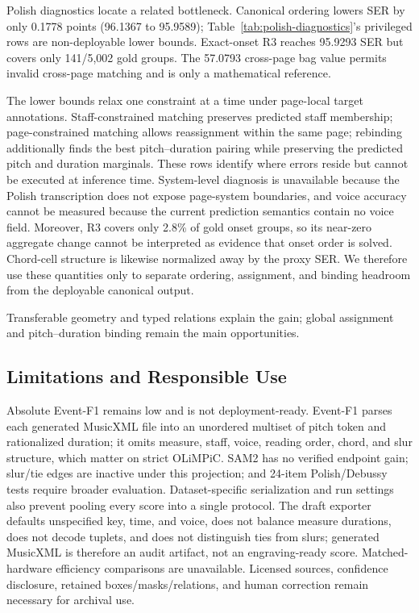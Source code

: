 \FloatBarrier

Polish diagnostics locate a related bottleneck. Canonical ordering lowers SER by only 0.1778 points (96.1367 to 95.9589); Table~\ref{tab:polish-diagnostics}'s privileged rows are non-deployable lower bounds. Exact-onset R3 reaches 95.9293 SER but covers only 141/5,002 gold groups. The 57.0793 cross-page bag value permits invalid cross-page matching and is only a mathematical reference.



The lower bounds relax one constraint at a time under page-local target annotations. Staff-constrained matching preserves predicted staff membership; page-constrained matching allows reassignment within the same page; rebinding additionally finds the best pitch--duration pairing while preserving the predicted pitch and duration marginals. These rows identify where errors reside but cannot be executed at inference time. System-level diagnosis is unavailable because the Polish transcription does not expose page-system boundaries, and voice accuracy cannot be measured because the current prediction semantics contain no voice field. Moreover, R3 covers only 2.8\% of gold onset groups, so its near-zero aggregate change cannot be interpreted as evidence that onset order is solved. Chord-cell structure is likewise normalized away by the proxy SER. We therefore use these quantities only to separate ordering, assignment, and binding headroom from the deployable canonical output.

\newpage
Transferable geometry and typed relations explain the gain; global assignment and pitch--duration binding remain the main opportunities.

\subsection{Limitations and Responsible Use}
Absolute Event-F1 remains low and is not deployment-ready. Event-F1 parses each generated MusicXML file into an unordered multiset of pitch token and rationalized duration; it omits measure, staff, voice, reading order, chord, and slur structure, which matter on strict OLiMPiC. SAM2 has no verified endpoint gain; slur/tie edges are inactive under this projection; and 24-item Polish/Debussy tests require broader evaluation. Dataset-specific serialization and run settings also prevent pooling every score into a single protocol. The draft exporter defaults unspecified key, time, and voice, does not balance measure durations, does not decode tuplets, and does not distinguish ties from slurs; generated MusicXML is therefore an audit artifact, not an engraving-ready score. Matched-hardware efficiency comparisons are unavailable. Licensed sources, confidence disclosure, retained boxes/masks/relations, and human correction remain necessary for archival use.
